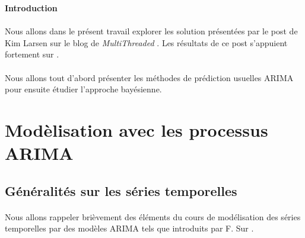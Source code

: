 \documentclass{article}
\theoremstyle{definition}
\theoremstyle{remark}
\begin{document}

\tableofcontents

\newpage
{\textbf{\Huge Introduction \\}}

\paragraph{}
Nous allons dans le présent travail explorer les solution présentées par le post de Kim Larsen sur le blog de 
\textit{MultiThreaded} \cite{sorryarima}. 
Les résultats de ce post s'appuient fortement sur \cite{pedictbayesian}.

\paragraph{}
Nous allons tout d'abord présenter les méthodes de prédiction usuelles ARIMA pour ensuite étudier l'approche bayésienne.

\newpage


\section{Modèlisation avec les processus ARIMA}

\subsection{Généralités sur les séries temporelles}
\paragraph{}
Nous allons rappeler brièvement des éléments du cours de modélisation des séries temporelles par des modèles ARIMA 
tels que introduits par F. Sur \cite{courssur}.
\end{document}
